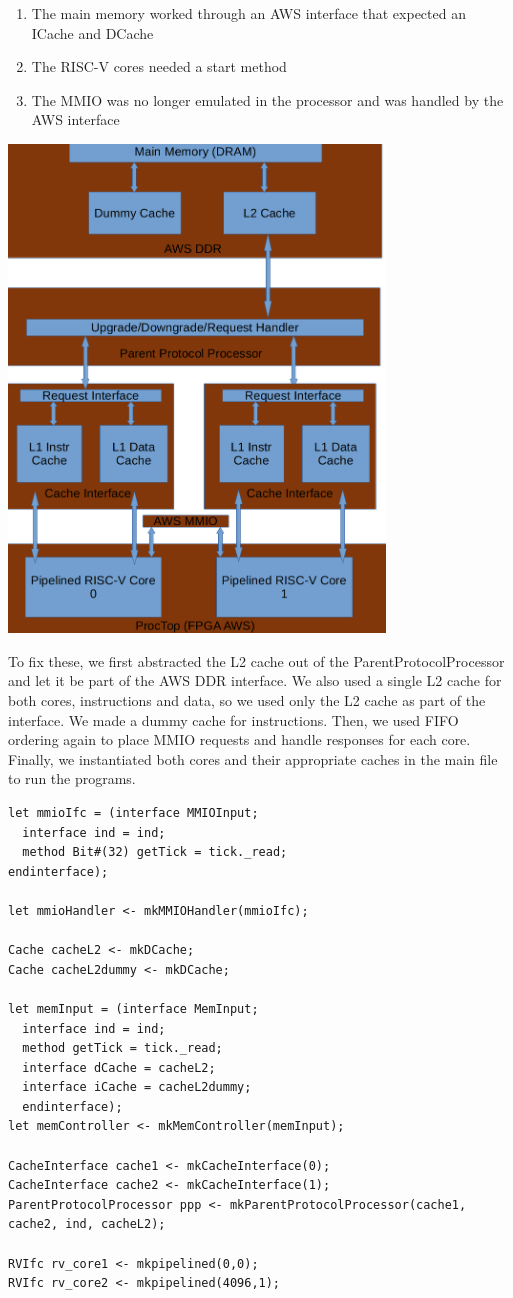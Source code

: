 \documentclass{article}
\begin{document}
\begin{enumerate}[(1)]
  \item The main memory worked through an AWS interface that expected an ICache and DCache
  \item The RISC-V cores needed a start method
  \item The MMIO was no longer emulated in the processor and was handled by the AWS interface
\end{enumerate}

\includegraphics[width=10cm]{fpga.png}

To fix these, we first abstracted the L2 cache out of the ParentProtocolProcessor and let it be part of the AWS DDR interface. We also used a single L2 cache for both cores, instructions and data, so we used only the L2 cache as part of the interface. We made a dummy cache for instructions. Then, we used FIFO ordering again to place MMIO requests and handle responses for each core. Finally, we instantiated both cores and their appropriate caches in the main file to run the programs.

\begin{lstlisting}
let mmioIfc = (interface MMIOInput;
  interface ind = ind;
  method Bit#(32) getTick = tick._read;
endinterface);

let mmioHandler <- mkMMIOHandler(mmioIfc);

Cache cacheL2 <- mkDCache;
Cache cacheL2dummy <- mkDCache;

let memInput = (interface MemInput;
  interface ind = ind;
  method getTick = tick._read;
  interface dCache = cacheL2;
  interface iCache = cacheL2dummy;
  endinterface);
let memController <- mkMemController(memInput);

CacheInterface cache1 <- mkCacheInterface(0);
CacheInterface cache2 <- mkCacheInterface(1);
ParentProtocolProcessor ppp <- mkParentProtocolProcessor(cache1, cache2, ind, cacheL2);

RVIfc rv_core1 <- mkpipelined(0,0);
RVIfc rv_core2 <- mkpipelined(4096,1);
\end{lstlisting}
\end{document}

